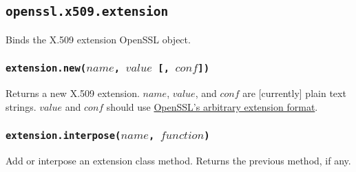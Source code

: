 \documentclass[11pt, oneside]{memoir}
\newcommand*{\fn}[1]{\texttt{#1}\xspace}
\newcounter{toccols}
\newenvironment{Module}[1]{
	\subsection{\texttt{#1}}
	\addtocontents{toc}{
		\protect\begin{multicols}{\value{toccols}}
	}
}{
	\addtocontents{toc}{\protect\end{multicols}}
}
\begin{document}
\begin{Module}{openssl.x509.extension}

Binds the X.509 extension OpenSSL object.

\subsubsection[\fn{extension.new}]{\fn{extension.new($name$, $value$ [, $conf$])}}

Returns a new X.509 extension. $name$, $value$, and $conf$ are [currently] plain text strings.
$value$ and $conf$ should use \href{https://www.openssl.org/docs/apps/x509v3_config.html#ARBITRARY_EXTENSIONS}{OpenSSL's arbitrary extension format}.

\subsubsection[\fn{extension.interpose}]{\fn{extension.interpose($name$, $function$)}}

Add or interpose an extension class method. Returns the previous method, if any.

\end{Module}
\end{document}
